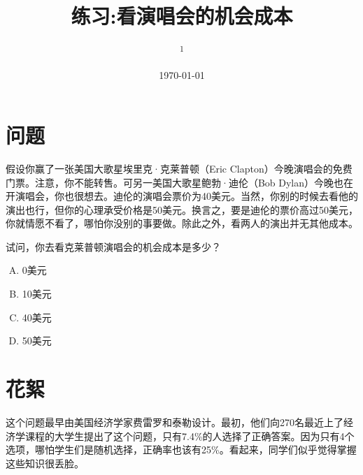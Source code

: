 \documentclass[10pt, a4paper]{ctexart} %
\title{练习:看演唱会的机会成本}%
\author{
	\authorstyle{鲁晓东\textsuperscript{1}} %
	\newline\newline %
	\textsuperscript{1}\institution{中山大学岭南学院经济学系}\\ %
}
\date{\today} %
\begin{document}
\maketitle %

\thispagestyle{firstpage} %


	
	







\section*{问题}



假设你赢了一张美国大歌星埃里克·克莱普顿（Eric Clapton）今晚演唱会的免费门票。注意，你不能转售。可另一美国大歌星鲍勃·迪伦（Bob Dylan）今晚也在开演唱会，你也很想去。迪伦的演唱会票价为40美元。当然，你别的时候去看他的演出也行，但你的心理承受价格是50美元。换言之，要是迪伦的票价高过50美元，你就情愿不看了，哪怕你没别的事要做。除此之外，看两人的演出并无其他成本。

试问，你去看克莱普顿演唱会的机会成本是多少？ 

\begin{enumerate}[A.]
	\item 0美元
	\item 10美元
	\item 40美元
	\item 50美元
\end{enumerate}


\section*{花絮}
这个问题最早由美国经济学家费雷罗和泰勒设计。最初，他们向270名最近上了经济学课程的大学生提出了这个问题，只有7.4\%的人选择了正确答案。因为只有4个选项，哪怕学生们是随机选择，正确率也该有25\%。看起来，同学们似乎觉得掌握这些知识很丢脸。
\end{document}
